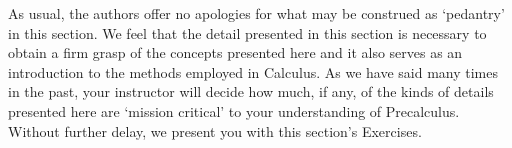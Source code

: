 {\begin{enumerate}
\end{enumerate}


}

\medskip

As usual, the authors offer no apologies for what may be construed as `pedantry' in this section.  We feel that the detail presented in this section is necessary to obtain a firm grasp of the concepts presented here and it also serves as an introduction to the methods employed in Calculus.  As we have said many times in the past, your instructor will decide how much, if any, of the kinds of details presented here are `mission critical' to your understanding of Precalculus. Without further delay, we present you with this section's Exercises.

